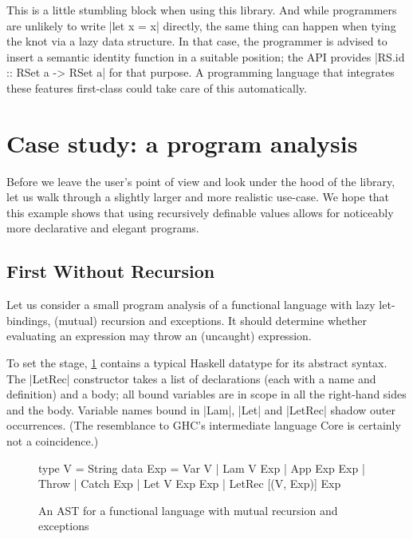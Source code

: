 \documentclass[manuscript,screen,acmsmall,nonacm]{acmart}
\begin{document}
This is a little stumbling block when using this library. And while programmers are unlikely to write |let x = x| directly, the same thing can happen when tying the knot via a lazy data structure. In that case, the programmer is advised to insert a semantic identity function in a suitable position; the API provides |RS.id :: RSet a -> RSet a| for that purpose.
A programming language that integrates these features first-class could take care of this automatically.

\section{Case study: a program analysis}\label{sec:casestudy}

Before we leave the user's point of view and look under the hood of the library, let us walk through a slightly larger and more realistic use-case. We hope that this example shows that using recursively definable values allows for noticeably more declarative and elegant programs.

\subsection{First Without Recursion}

Let us consider a small program analysis of a functional language with lazy let-bindings, (mutual) recursion and exceptions. It should determine whether evaluating an expression may throw an (uncaught) expression.

To set the stage, \cref{fig:analast} contains a typical Haskell datatype for its abstract syntax. The |LetRec| constructor takes a list of declarations (each with a name and definition) and a body; all bound variables are in scope in all the right-hand sides and the body.
Variable names bound in |Lam|, |Let| and |LetRec| shadow outer occurrences. (The resemblance to GHC's intermediate language Core \citep{secrets} is certainly not a coincidence.)

\begin{figure}
\setlength{\abovedisplayskip}{0pt}%
\setlength{\belowdisplayskip}{0pt}%
\begin{code}
type V    =  String
data Exp  =  Var V | Lam V Exp | App Exp Exp | Throw | Catch Exp
          |  Let V Exp Exp | LetRec [(V, Exp)] Exp
\end{code}
\caption{An AST for a functional language with mutual recursion and exceptions}
\label{fig:analast}
\end{figure}
\end{document}
